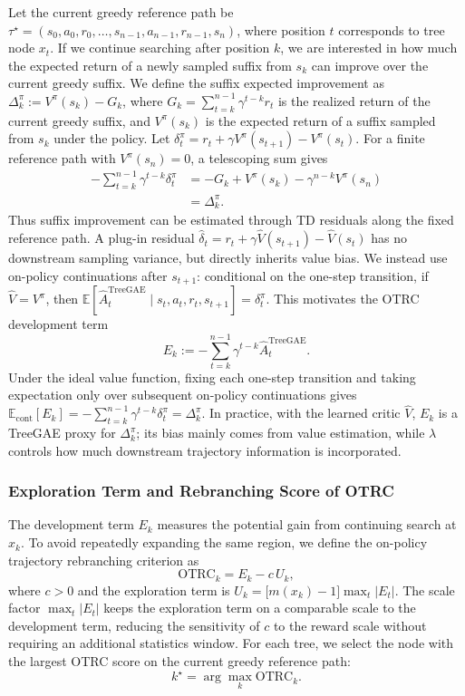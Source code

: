 Let the current greedy reference path be $\tau^\star=(s_0,a_0,r_0,\ldots,s_{n-1},a_{n-1},r_{n-1},s_n)$, where position $t$ corresponds to tree node $x_t$. If we continue searching after position $k$, we are interested in how much the expected return of a newly sampled suffix from $s_k$ can improve over the current greedy suffix. We define the suffix expected improvement as $\Delta_k^\pi:=V^\pi(s_k)-G_k$, where $G_k=\sum_{t=k}^{n-1}\gamma^{t-k}r_t$ is the realized return of the current greedy suffix, and $V^\pi(s_k)$ is the expected return of a suffix sampled from $s_k$ under the policy. Let $\delta^\pi_t=r_t+\gamma V^\pi(s_{t+1})-V^\pi(s_t)$. For a finite reference path with $V^\pi(s_n)=0$, a telescoping sum gives
\[
\begin{aligned}
-\sum_{t=k}^{n-1}\gamma^{t-k}\delta^\pi_t
&=
-G_k+V^\pi(s_k)-\gamma^{n-k}V^\pi(s_n)\\
&=
\Delta_k^\pi.
\end{aligned}
\]
Thus suffix improvement can be estimated through TD residuals along the fixed reference path. A plug-in residual $\hat\delta_t=r_t+\gamma\hat V(s_{t+1})-\hat V(s_t)$ has no downstream sampling variance, but directly inherits value bias. We instead use on-policy continuations after $s_{t+1}$: conditional on the one-step transition, if $\hat V=V^\pi$, then $\mathbb{E}[\hat A^{\mathrm{TreeGAE}}_t\mid s_t,a_t,r_t,s_{t+1}]=\delta^\pi_t$. This motivates the OTRC development term
\begin{equation}
\label{eq:otrc-development}
E_k
:=
-\sum_{t=k}^{n-1}\gamma^{t-k}
\hat A^{\mathrm{TreeGAE}}_t.
\end{equation}
Under the ideal value function, fixing each one-step transition and taking expectation only over subsequent on-policy continuations gives $\mathbb{E}_{\mathrm{cont}}[E_k]=-\sum_{t=k}^{n-1}\gamma^{t-k}\delta^\pi_t=\Delta_k^\pi$. In practice, with the learned critic $\hat V$, $E_k$ is a TreeGAE proxy for $\Delta_k^\pi$; its bias mainly comes from value estimation, while $\lambda$ controls how much downstream trajectory information is incorporated.

\subsubsection{Exploration Term and Rebranching Score of OTRC}

The development term $E_k$ measures the potential gain from continuing search at $x_k$. To avoid repeatedly expanding the same region, we define the on-policy trajectory rebranching criterion as
\begin{equation}
\label{eq:otrc-score}
\mathrm{OTRC}_k
=
E_k-c\,U_k,
\end{equation}
where $c>0$ and the exploration term is
$U_k=\bigl[m(x_k)-1\bigr]\max_t |E_t|$.
The scale factor $\max_t |E_t|$ keeps the exploration term on a comparable scale to the development term, reducing the sensitivity of $c$ to the reward scale without requiring an additional statistics window. For each tree, we select the node with the largest OTRC score on the current greedy reference path:
\[
k^\star
=
\arg\max_k \mathrm{OTRC}_k.
\]

